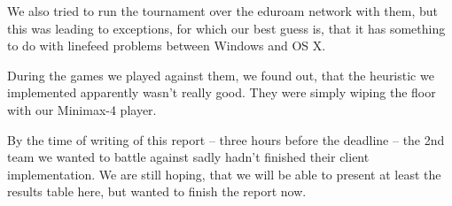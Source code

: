 \documentclass{scrartcl}
\begin{document}
We also tried to run the tournament over the eduroam network with them, but this was leading to exceptions, for which our best guess is, that it has something to do with linefeed problems between Windows and OS X.

During the games we played against them, we found out, that the heuristic we implemented apparently wasn't really good. They were simply wiping the floor with our Minimax-4 player.

By the time of writing of this report -- three hours before the deadline -- the 2nd team we wanted to battle against sadly hadn't finished their client implementation. We are still hoping, that we will be able to present at least the results table here, but wanted to finish the report now.
\end{document}
